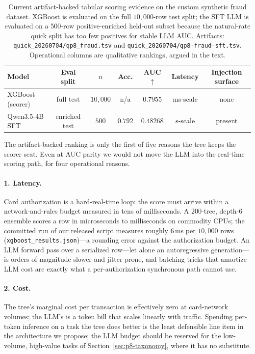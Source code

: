 \documentclass{article}
\providecommand{\secref}[1]{Section~\ref{#1}}
\begin{document}
\begin{table}[t]
\centering
\caption{Current artifact-backed tabular scoring evidence on the custom
synthetic fraud dataset. XGBoost is evaluated on the full $10{,}000$-row test
split; the SFT LLM is evaluated on a 500-row positive-enriched held-out subset
because the natural-rate quick split has too few positives for stable LLM AUC.
Artifacts: \texttt{quick\_20260704/qp8\_fraud.tsv} and
\texttt{quick\_20260704/qp8-fraud-sft.tsv}. Operational columns are qualitative
rankings, argued in the text.}
\label{tab:p8-headtohead}
\small
\begin{tabular}{lcccccc}
\toprule
Model & Eval split & $n$ & Acc. & AUC $\uparrow$ & Latency & Injection surface \\
\midrule
XGBoost (scorer) & full test & $10{,}000$ & n/a & $\mathbf{0.7955}$ & ms-scale & none \\
Qwen3.5-4B SFT   & enriched test & $500$ & $0.792$ & $0.48268$ & s-scale & present \\
\bottomrule
\end{tabular}
\end{table}

The artifact-backed ranking is only the first of five reasons the tree keeps
the scorer seat. Even at AUC parity we would not move the LLM into the real-time scoring
path, for four operational reasons.

\paragraph{1. Latency.} Card authorization is a hard-real-time loop: the score
must arrive within a network-and-rules budget measured in tens of
milliseconds. A 200-tree, depth-6 ensemble scores a row in microseconds to
milliseconds on commodity CPUs; the committed run of our released script
measures roughly $6$\,ms per $10{,}000$ rows
(\texttt{xgboost\_results.json})---a rounding error against the authorization
budget. An LLM
forward pass over a serialized row---let alone an autoregressive
generation---is orders of magnitude slower and jitter-prone, and batching
tricks that amortize LLM cost are exactly what a per-authorization
synchronous path cannot use.

\paragraph{2. Cost.} The tree's marginal cost per transaction is effectively
zero at card-network volumes; the LLM's is a token bill that scales linearly
with traffic. Spending per-token inference on a task the tree does better is
the least defensible line item in the architecture we propose; the LLM budget
should be reserved for the low-volume, high-value tasks of
\secref{sec:p8-taxonomy}, where it has no substitute.
\end{document}
